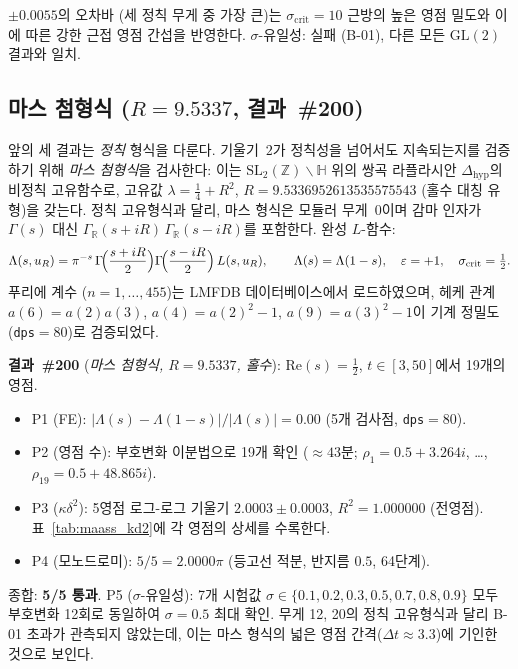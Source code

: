 \documentclass[11pt, a4paper]{article}
\theoremstyle{plain}
\theoremstyle{definition}
\begin{document}
$\pm 0.0055$의 오차바 (세 정칙 무게 중 가장 큰)는
$\sigma_{\mathrm{crit}}=10$ 근방의 높은 영점 밀도와
이에 따른 강한 근접 영점 간섭을 반영한다.
$\sigma$-유일성: 실패 (B-01), 다른 모든 $\mathrm{GL}(2)$ 결과와 일치.

\subsection{마스 첨형식 ($R=9.5337$, 결과~\#200)}
\label{ssec:maass}

앞의 세 결과는 \emph{정칙} 형식을 다룬다. 기울기~$2$가 정칙성을
넘어서도 지속되는지를 검증하기 위해 \emph{마스 첨형식}을 검사한다:
이는 $\mathrm{SL}_2(\mathbb{Z})\backslash\mathbb{H}$ 위의 쌍곡
라플라시안 $\Delta_{\mathrm{hyp}}$의 비정칙 고유함수로,
고유값 $\lambda = \tfrac{1}{4}+R^2$, $R=9.5336952613535575543$
(홀수 대칭 유형)을 갖는다.
정칙 고유형식과 달리, 마스 형식은 모듈러 무게~$0$이며
감마 인자가 $\Gamma(s)$ 대신
$\Gamma_{\mathbb{R}}(s+iR)\,\Gamma_{\mathbb{R}}(s-iR)$를 포함한다.
완성 $L$-함수:
\[
  \Lambda(s,u_R) = \pi^{-s}\,
  \Gamma\!\Bigl(\frac{s+iR}{2}\Bigr)
  \Gamma\!\Bigl(\frac{s-iR}{2}\Bigr)\,L(s,u_R), \qquad
  \Lambda(s)=\Lambda(1-s), \quad \varepsilon=+1, \quad
  \sigma_{\mathrm{crit}}=\tfrac{1}{2}.
\]
푸리에 계수 ($n=1,\ldots,455$)는 LMFDB 데이터베이스에서 로드하였으며,
헤케 관계 $a(6)=a(2)a(3)$, $a(4)=a(2)^2-1$, $a(9)=a(3)^2-1$이
기계 정밀도 (\texttt{dps}$=80$)로 검증되었다.

\medskip
\noindent\textbf{결과~\#200} (\textit{마스 첨형식, $R=9.5337$, 홀수}):
$\mathrm{Re}(s)=\tfrac{1}{2}$, $t\in[3,50]$에서 19개의 영점.

\begin{itemize}
  \item P1 (FE): $|\Lambda(s)-\Lambda(1-s)|/|\Lambda(s)|=0.00$ (5개 검사점,
        \texttt{dps}$=80$).
  \item P2 (영점 수): 부호변화 이분법으로 19개 확인
        ($\approx 43$분; $\rho_1=0.5+3.264i$, \ldots, $\rho_{19}=0.5+48.865i$).
  \item P3 ($\kappa\delta^{2}$): 5영점 로그-로그 기울기
        $\mathbf{2.0003\pm 0.0003}$, $R^{2}=1.000000$ (전영점).
        표~\ref{tab:maass_kd2}에 각 영점의 상세를 수록한다.
  \item P4 (모노드로미): $5/5=2.0000\pi$ (등고선 적분, 반지름 $0.5$,
        64단계).
\end{itemize}
종합: \textbf{5/5 통과}.  P5 ($\sigma$-유일성): 7개 시험값
$\sigma\in\{0.1,0.2,0.3,0.5,0.7,0.8,0.9\}$ 모두 부호변화 12회로 동일하여
$\sigma=0.5$ 최대 확인.  무게 12, 20의 정칙 고유형식과 달리 B-01 초과가
관측되지 않았는데, 이는 마스 형식의 넓은 영점 간격($\Delta t\approx 3.3$)에
기인한 것으로 보인다.
\end{document}
